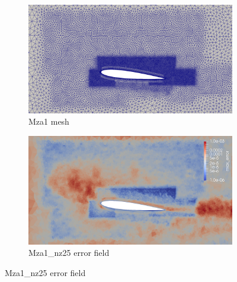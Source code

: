 \begin{figure}[H]
\begin{subfigure}[b]{0.475\textwidth}
	\centering
	\includegraphics[width=1\textwidth]{figures/zonal_adapt_results/Mesh_and_error_plots/Mza1_inplane.png}
	\caption{Mza1 mesh}
	\label{fig:zonal_Mza1_mesh}
\end{subfigure}
\begin{subfigure}[b]{0.475\textwidth}
	\centering
	\includegraphics[width=1\textwidth]{figures/zonal_adapt_results/Mesh_and_error_plots/Mza1_error.png}
	\caption{Mza1\_nz25 error field}
	\label{fig:zonal_Mza1_error}
\end{subfigure}



\end{figure}
